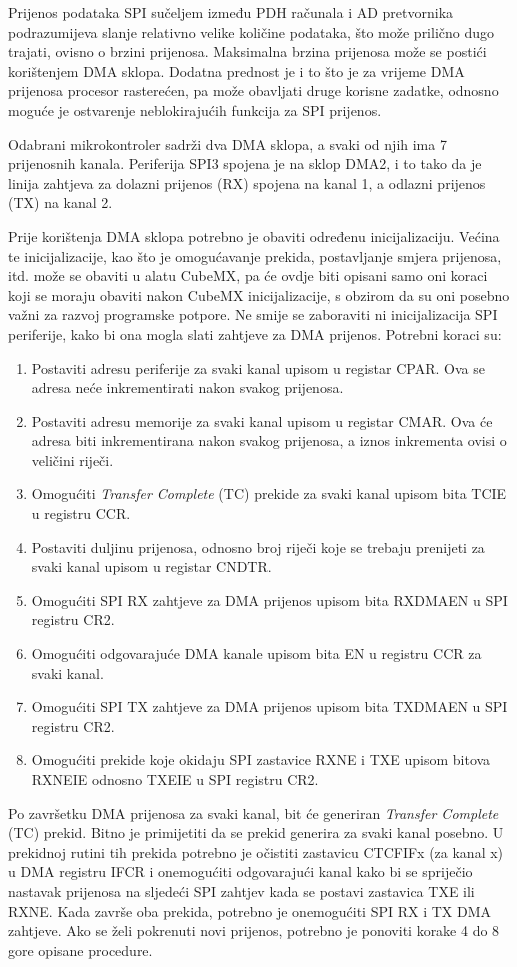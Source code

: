 		Prijenos podataka SPI sučeljem između PDH računala i AD pretvornika podrazumijeva slanje relativno velike količine podataka, što može prilično dugo trajati, ovisno o brzini prijenosa. Maksimalna brzina prijenosa može se postići korištenjem DMA sklopa. Dodatna prednost je i to što je za vrijeme DMA prijenosa procesor rasterećen, pa može obavljati druge korisne zadatke, odnosno moguće je ostvarenje neblokirajućih funkcija za SPI prijenos.
		
		Odabrani mikrokontroler sadrži dva DMA sklopa, a svaki od njih ima 7 prijenosnih kanala. Periferija SPI3 spojena je na sklop DMA2, i to tako da je linija zahtjeva za dolazni prijenos (RX) spojena na kanal 1, a odlazni prijenos (TX) na kanal 2. 
		
		Prije korištenja DMA sklopa potrebno je obaviti određenu inicijalizaciju. Većina te inicijalizacije, kao što je omogućavanje prekida, postavljanje smjera prijenosa, itd. može se obaviti u alatu CubeMX, pa će ovdje biti opisani samo oni koraci koji se moraju obaviti nakon CubeMX inicijalizacije, s obzirom da su oni posebno važni za razvoj programske potpore. Ne smije se zaboraviti ni inicijalizacija SPI periferije, kako bi ona mogla slati zahtjeve za DMA prijenos. Potrebni koraci su:
		\begin{enumerate}
			\item Postaviti adresu periferije za svaki kanal upisom u registar CPAR. Ova se adresa neće inkrementirati nakon svakog prijenosa.
			\item Postaviti adresu memorije za svaki kanal upisom u registar CMAR. Ova će adresa biti inkrementirana nakon svakog prijenosa, a iznos inkrementa ovisi o veličini riječi.
			\item Omogućiti \textit{Transfer Complete} (TC) prekide za svaki kanal upisom bita TCIE u registru CCR.
			\item Postaviti duljinu prijenosa, odnosno broj riječi koje se trebaju prenijeti za svaki kanal upisom u registar CNDTR.
			\item Omogućiti SPI RX zahtjeve za DMA prijenos upisom bita RXDMAEN u SPI registru CR2.
			\item Omogućiti odgovarajuće DMA kanale upisom bita EN u registru CCR za svaki kanal.
			\item Omogućiti SPI TX zahtjeve za DMA prijenos upisom bita TXDMAEN u SPI registru CR2.
			\item Omogućiti prekide koje okidaju SPI zastavice RXNE i TXE upisom bitova RXNEIE odnosno TXEIE u SPI registru CR2.
		\end{enumerate}
		
		Po završetku DMA prijenosa za svaki kanal, bit će generiran \textit{Transfer Complete} (TC) prekid. Bitno je primijetiti da se prekid generira za svaki kanal posebno. U prekidnoj rutini tih prekida potrebno je očistiti zastavicu CTCFIFx (za kanal x) u DMA registru IFCR i onemogućiti odgovarajući kanal kako bi se spriječio nastavak prijenosa na sljedeći SPI zahtjev kada se postavi zastavica TXE ili RXNE. Kada završe oba prekida, potrebno je onemogućiti SPI RX i TX DMA zahtjeve. Ako se želi pokrenuti novi prijenos, potrebno je ponoviti korake 4 do 8 gore opisane procedure.
		
		